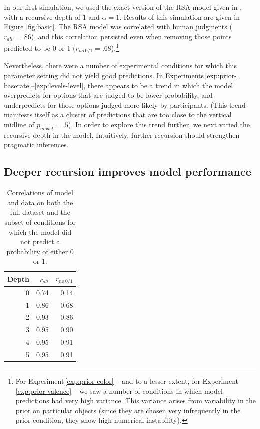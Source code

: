 \documentclass[man,noapacite]{apa2}
\newcounter{Experiment}
\newcommand{\exptref}[1]{Experiment\,\ref{#1}}
\newcommand{\exptrefrange}[2]{Experiments\,\ref{#1}--\ref{#2}}
\begin{document}
In our first simulation, we used the exact version of the RSA model given in , with a recursive depth of 1 and $\alpha=1$. Results of this simulation are given in Figure \ref{fig:basic}. The RSA model was correlated with human judgments ($r_{all} = .86$), and this correlation persisted even when removing those points predicted to be 0 or 1 ($r_{no~0/1} = .68$).\footnote{For \exptref{exp:prior-color} -- and to a lesser extent, for \exptref{exp:prior-valence} -- we saw a number of conditions in which model predictions had very high variance. This variance arises from variability in the prior on particular objects (since they are chosen very infrequently in the prior condition, they show high numerical instability).}

Nevertheless, there were a number of experimental conditions for which this parameter setting did not yield good predictions. In \exptrefrange{exp:prior-baserate}{exp:levels-level}, there appears to be a trend in which the model overpredicts for options that are judged to be lower probability, and underpredicts for those options judged more likely by participants. (This trend manifests itself as a cluster of predictions that are too close to the vertical midline of $p_{model}=.5$). In order to explore this trend further, we next varied the recursive depth in the model. Intuitively, further recursion should strengthen pragmatic inferences.

\subsection{Deeper recursion improves model performance}

\begin{table}[ht]
\centering
\begin{tabular}{rrr}
  \hline
Depth & $r_{all}$ & $r_{no~0/1}$ \\
  \hline
  0 & 0.74 & 0.14 \\
    1 & 0.86 & 0.68 \\
    2 & 0.93 & 0.86 \\
    3 & 0.95 & 0.90 \\
    4 & 0.95 & 0.91 \\
    5 & 0.95 & 0.91 \\
   \hline
\end{tabular}
\caption{\label{tab:corr-a1} Correlations of model and data on both the full dataset and the subset of conditions for which the model did not predict a probability of either 0 or 1.}
\end{table}
\end{document}
